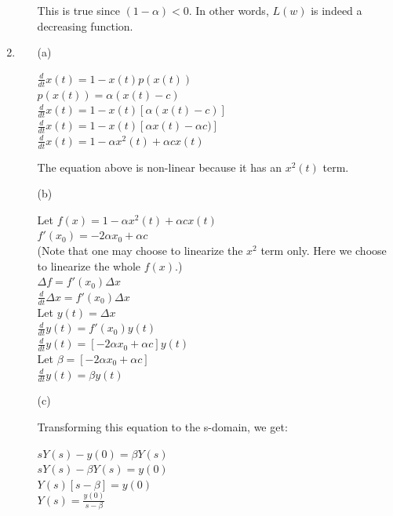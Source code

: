 \documentclass{article}
\begin{document}
\begin{enumerate}
\begin{itemize}
\noindent This is true since $(1-\alpha) < 0$. In other words,
$L(w)$ is indeed a decreasing function. \bigbreak
\end{itemize}

\item

\begin{itemize}
\item[(a)] \smallbreak

\noindent ${\frac{d}{dt}}x(t) = 1 - x(t)p(x(t))$\\
\noindent $p(x(t)) = \alpha(x(t) - c)$\\
\noindent ${\frac{d}{dt}}x(t) = 1 - x(t)[\alpha (x(t) - c)]$\\
\noindent ${\frac{d}{dt}}x(t) = 1 - x(t)[\alpha x(t) - \alpha c)]$\\
\noindent ${\frac{d}{dt}}x(t) = 1 -\alpha x^2(t) + \alpha cx(t)$
\bigbreak

\noindent The equation above is non-linear because it has an
$x^2(t)$ term. \bigbreak


\item[(b)] \smallbreak



\noindent Let $f(x) = 1 -\alpha x^2(t) + \alpha cx(t)$\\
\noindent $f'(x_0) = -2 \alpha x_0 + \alpha c$  \\ 
(Note that one may choose to linearize the $x^2$ term only. Here we choose to linearize the whole $f(x)$.) \\
\noindent $\Delta f = f'(x_0) \Delta x$\\
\noindent ${\frac{d}{dt}} \Delta x = f'(x_0) \Delta x$\\
\noindent Let $y(t) = \Delta x$\\
\noindent ${\frac{d}{dt}} y(t) = f'(x_0) y(t)$\\
\noindent ${\frac{d}{dt}} y(t) = [-2 \alpha x_0 + \alpha c]y(t)$\\
\noindent Let $\beta = [-2 \alpha x_0 + \alpha c]$\\
\noindent ${\frac{d}{dt}} y(t) = \beta y(t)$ \bigbreak

\item[(c)] \smallbreak

\noindent Transforming this equation to the s-domain, we get:
\smallbreak

\noindent $sY(s) -y(0) = \beta Y(s)$\\
\noindent $sY(s) - \beta Y(s) = y(0)$\\
\noindent $Y(s)[s - \beta] = y(0)$\\
\noindent $Y(s) = {\frac{y(0)}{s - \beta}}$ \bigbreak


\end{itemize}
\end{enumerate}
\end{document}
